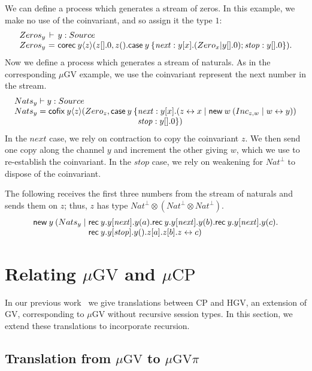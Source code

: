 \documentclass[orivec,envcountsame]{llncs}
\makeatletter
\newcommand{\cpdual}[1]{#1^\perp}
\newcommand{\mkwd}[1]{\mathsf{#1}}
\newcommand{\link}[2]{#1 \leftrightarrow #2}
\newcommand{\cut}[4]{\mkwd{new}\:#1 \: (#3 \mid #4)}
\newcommand{\rec}[1]{\mkwd{rec}\:#1}
\newcommand{\corec}[4]{\mkwd{corec}\:{#1} \langle #2 \rangle (#3,#4)}
\newcommand{\clabel}[1]{\mathit{#1}}
\renewcommand{\case}[2]{\mkwd{case}\:#1\:\{#2\}}
\newcommand{\sel}[2]{#1[\clabel{#2}]}
\newcommand{\lrkwd}{\mkwd{cofix}}
\newcommand{\key}{\mkwd}
\newcommand{\mucp}{$\mu\mathrm{CP}$\xspace}
\newcommand{\mugv}{$\mu\mathrm{GV}$\xspace}
\newcommand{\gvpi}{$\mu\mathrm{GV}\pi$\xspace}
\newcommand{\ba}{\begin{array}}
\newcommand{\ea}{\end{array}}
\newcommand{\bl}{\ba[t]{@{}l@{}}}
\newcommand{\el}{\ea}
\newenvironment{eqs}{\ba{@{}r@{~}c@{~}l@{}}}{\ea}
\makeatother
\begin{document}
We can define a process which generates a stream of zeros. In this example, we make no use of the
coinvariant, and so assign it the type $1$:
\small\[\begin{eqs}
  Zeros_y &\vdash& y:Source \\
  Zeros_y &=& \corec{y}{z}{z[].0}{z().\case{y}{\clabel{next}: y[x].(Zero_x | y[].0); \clabel{stop}: y[].0}}.
\end{eqs}\]\normalsize
Now we define a process which generates a stream of naturals. As in the corresponding \mugv example,
we use the coinvariant represent the next number in the stream.
%
\small\[
\bl
  Nats_y \vdash y:Source \\
  Nats_y = \lrkwd \: y \langle z \rangle (Zero_z,
    \key{case}\:y \:\{
       \bl
       \clabel{next}: y[x].(\link{z}{x} \mid \cut{w}{}{Inc_{z,w}}{\link{w}{y}}) \\
       \clabel{stop}: y[].0\}) \\
       \el \\
\el
\]\normalsize
%
In the $\clabel{next}$ case, we rely on contraction to copy the coinvariant $z$.  We then send one
copy along the channel $y$ and increment the other giving $w$, which we use to re-establish the
coinvariant. In the $\clabel{stop}$ case, we rely on weakening for $\cpdual{Nat}$ to dispose of the
coinvariant.

The following receives the first three numbers from the stream of naturals and sends them on $z$;
thus, $z$ has type $\cpdual{Nat} \otimes (\cpdual{Nat} \otimes \cpdual{Nat})$.
%
\small\[
\bl
  \mkwd{new}\:y\:(Nats_y \mid \bl
    \rec{y}.\sel{y}{next}.y(a).
    \rec{y}.\sel{y}{next}.y(b).
    \rec{y}.\sel{y}{next}.y(c). \\
    \rec{y}.\sel{y}{stop}.y().
    z[a].z[b].\link{z}{c}) \el
\el\]\normalsize %

\section{Relating \mugv and \mucp}\label{sec:translation}

In our previous work~\citep{LindleyM14} we give translations between CP and HGV, an extension of GV,
corresponding to \mugv without recursive session types. In this section, we extend these
translations to incorporate recursion.

\subsection{Translation from \mugv to \gvpi}\label{sec:gvtogvpi}
\end{document}
